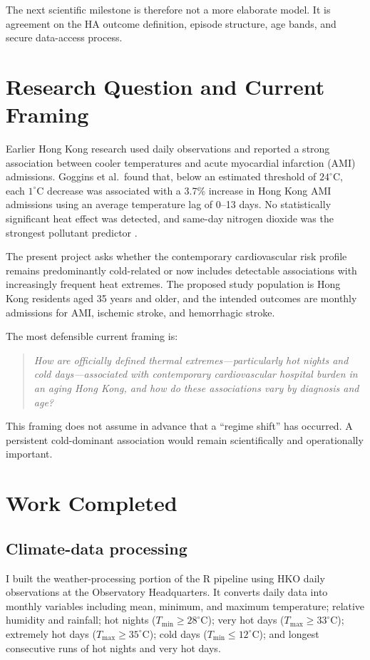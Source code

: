 \documentclass[11pt]{article}
\begin{document}
The next scientific milestone is therefore not a more elaborate model. It is
agreement on the HA outcome definition, episode structure, age bands, and
secure data-access process.

\section{Research Question and Current Framing}

Earlier Hong Kong research used daily observations and reported a strong
association between cooler temperatures and acute myocardial infarction
(AMI) admissions. Goggins et al.\ found that, below an estimated threshold of
$24^\circ$C, each $1^\circ$C decrease was associated with a 3.7\% increase in
Hong Kong AMI admissions using an average temperature lag of 0--13 days.
No statistically significant heat effect was detected, and same-day
nitrogen dioxide was the strongest pollutant predictor \cite{goggins2013}.

The present project asks whether the contemporary cardiovascular risk profile
remains predominantly cold-related or now includes detectable associations
with increasingly frequent heat extremes. The proposed study population is
Hong Kong residents aged 35 years and older, and the intended outcomes are
monthly admissions for AMI, ischemic stroke, and hemorrhagic stroke.

The most defensible current framing is:

\begin{quote}
\textit{How are officially defined thermal extremes---particularly hot nights
and cold days---associated with contemporary cardiovascular hospital burden
in an aging Hong Kong, and how do these associations vary by diagnosis and
age?}
\end{quote}

This framing does not assume in advance that a ``regime shift'' has occurred.
A persistent cold-dominant association would remain scientifically and
operationally important.

\section{Work Completed}

\subsection{Climate-data processing}

I built the weather-processing portion of the R pipeline using HKO daily
observations at the Observatory Headquarters. It converts daily data into
monthly variables including mean, minimum, and maximum temperature; relative
humidity and rainfall; hot nights ($T_{\min}\ge 28^\circ$C); very hot days
($T_{\max}\ge 33^\circ$C); extremely hot days ($T_{\max}\ge 35^\circ$C); cold
days ($T_{\min}\le 12^\circ$C); and longest consecutive runs of hot nights and
very hot days.
\end{document}
